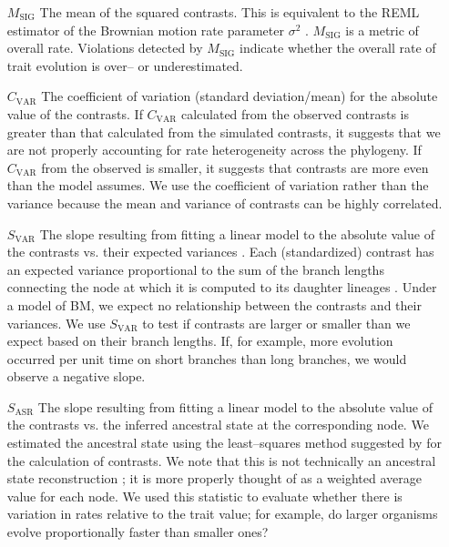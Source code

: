 \documentclass[a4paper,11pt]{article}
\begin{document}
\begin{enumerate}
\item[$M_{\text{SIG}}$] The mean of the squared contrasts. This is equivalent to the REML estimator of the Brownian motion rate parameter $\sigma^2$ \citep{Garland1992, Rohlf2001}. $M_{\text{SIG}}$ is a metric of overall rate. Violations detected by $M_{\text{SIG}}$ indicate whether the overall rate of trait evolution is over-- or underestimated.

\item[$C_{\text{VAR}}$] The coefficient of variation (standard deviation/mean) for the absolute value of the contrasts. If $C_{\text{VAR}}$ calculated from the observed contrasts is greater than that calculated from the simulated contrasts, it suggests that we are not properly accounting for rate heterogeneity across the phylogeny. If $C_{\text{VAR}}$ from the observed is smaller, it suggests that contrasts are more even than the model assumes. We use the coefficient of variation rather than the variance because the mean and variance of contrasts can be highly correlated.

\item[$S_{\text{VAR}}$] The slope resulting from fitting a linear model to the absolute value of the contrasts vs. their expected variances \citep[following][]{Garland1992}. Each (standardized) contrast has an expected variance proportional to the sum of the branch lengths connecting the node at which it is computed to its daughter lineages  \citep{Felsenstein1985}. Under a model of BM, we expect no relationship between the contrasts and their variances. We use $S_{\text{VAR}}$ to test if contrasts are larger or smaller than we expect based on their branch lengths. If, for example, more evolution occurred per unit time on short branches than long branches, we would observe a negative slope.

\item[$S_{\text{ASR}}$] The slope resulting from fitting a linear model to the absolute value of the contrasts vs. the inferred ancestral state at the corresponding node. We estimated the ancestral state using the least--squares method suggested by \citet{Felsenstein1985} for the calculation of contrasts. We note that this is not technically an ancestral state reconstruction \citep[see][]{Felsenstein1985}; it is more properly thought of as a weighted average value for each node. We used this statistic to evaluate whether there is variation in rates relative to the trait value; for example, do larger organisms evolve proportionally faster than smaller ones?


\end{enumerate}
\end{document}

